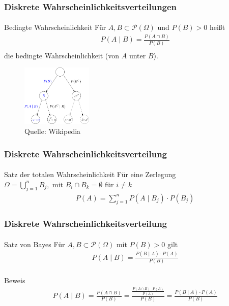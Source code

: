 \documentclass{beamer}
\begin{document}
\begin{frame}
    \frametitle{Diskrete Wahrscheinlichkeitsverteilungen}
\framesubtitle{}

\begin{block}{Bedingte  Wahrscheinlichkeit}
Für $A,B \subset \mathcal{P}(\Omega)$ und $P(B) > 0$ heißt
\begin{align*}
& P(A \; | \;  B) = \frac{P(A \cap B)}{P(B)} \\
\end{align*}
die bedingte Wahrscheinlichkeit (von $A$ unter $B$).
\end{block}


\begin{figure}[htp]
      \centering
    \includegraphics[width=0.3\textwidth]{img/Probability_tree}

      \caption{Quelle: Wikipedia}
\end{figure}

 \end{frame}


\begin{frame}
    \frametitle{Diskrete Wahrscheinlichkeitsverteilung}
\framesubtitle{}

\begin{block}{Satz der totalen Wahrscheinlichkeit}
Für eine Zerlegung  $\Omega = \bigcup_{j=1}^{n} B_j, \text{ mit } B_i \cap B_k = \emptyset \text{ für } i \neq k $
\begin{align*}
& P(A ) = \sum_{j=1}^{n}  P(A \; | \;  B_j) \cdot P(B_j)
\end{align*}
\end{block}

 \end{frame}



\begin{frame}
    \frametitle{Diskrete Wahrscheinlichkeitsverteilung}
\framesubtitle{}

\begin{block}{Satz von Bayes}
Für $A,B \subset \mathcal{P}(\Omega)$ mit  $P(B) > 0$ gilt
\begin{align*}
& P(A \; | \;  B) = \frac{P(B \; | \; A) \cdot P(A)} {P(B)} \\
\end{align*}
\end{block}

\begin{block}{Beweis}
\begin{align*}
& P(A \; | \;  B) =\frac{P(A \cap B)}{P(B)} = \frac{ \frac{P(A \cap B) \cdot P(A)}{P(A)}}{P(B)}  =  \frac{P(B \; | \; A) \cdot P(A)} {P(B)} 
\end{align*}
\end{block}



 \end{frame}
\end{document}
